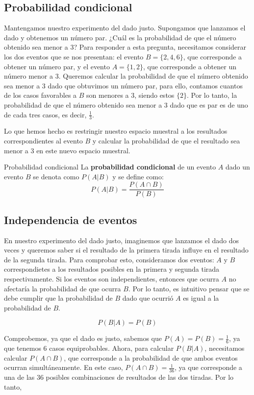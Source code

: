 \subsection{Probabilidad condicional}

Mantengamos nuestro experimento del dado justo. Supongamos que lanzamos el dado y obtenemos un número par.
¿Cuál es la probabilidad de que el número obtenido sea menor a 3? Para responder a esta pregunta, necesitamos considerar
los dos eventos que se nos presentan: el evento $B = \{2,4,6\}$, que corresponde a obtener un número par, y el evento $A = \{1,2\}$,
que corresponde a obtener un número menor a 3. Queremos calcular la probabilidad de que el número obtenido sea menor a 3 dado que 
obtuvimos un número par, para ello, contamos cuantos de los casos favorables a $B$ son menores a 3, siendo estos $\{2\}$. Por lo tanto,
la probabilidad de que el número obtenido sea menor a 3 dado que es par es de uno de cada tres casos, es decir, $\frac{1}{3}$.

Lo que hemos hecho es restringir nuestro espacio muestral a los resultados correspondientes al evento $B$ y 
calcular la probabilidad de que el resultado sea menor a 3 en este nuevo espacio muestral.

\begin{definicion}{Probabilidad condicional}
  La \textbf{probabilidad condicional} de un evento $A$ dado un evento $B$ se denota como $P(A|B)$ y se define como:
  \[
    P(A|B) = \frac{P(A \cap B)}{P(B)}
  \] 
\end{definicion}

\subsection{Independencia de eventos}

En nuestro experimento del dado justo, imaginemos que lanzamos el dado dos veces y queremos saber si el resultado de la primera tirada
influye en el resultado de la segunda tirada. Para comprobar esto, consideramos dos eventos: $A$ y $B$ correspondietes 
a los resultados posibles en la primera y segunda tirada respectivamente. Si los eventos son independientes, entonces que ocurra $A$ no 
afectaría la probabilidad de que ocurra $B$. Por lo tanto, es intuitivo pensar que se debe cumplir que la probabilidad de $B$ dado que 
ocurrió $A$ es igual a la probabilidad de $B$. 

$$ 
P(B|A) = P(B)
$$ 

Comprobemos, ya que el dado es justo, sabemos que $P(A) = P(B) = \frac{1}{6}$, ya que tenemos 6 casos equiprobables. Ahora, para calcular
$P(B|A)$, necesitamos calcular $P(A \cap B)$, que corresponde a la probabilidad de que ambos eventos ocurran simultáneamente. En este caso,
$P(A \cap B) = \frac{1}{36}$, ya que corresponde a una de las 36 posibles combinaciones de resultados de las dos tiradas. Por lo tanto,

